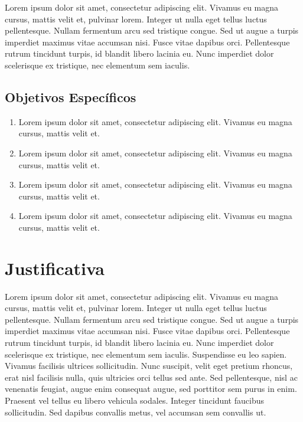 Lorem ipsum dolor sit amet, consectetur adipiscing elit. Vivamus eu magna cursus, mattis velit et, pulvinar lorem. Integer ut nulla eget tellus luctus pellentesque. Nullam fermentum arcu sed tristique congue. Sed ut augue a turpis imperdiet maximus vitae accumsan nisi. Fusce vitae dapibus orci. Pellentesque rutrum tincidunt turpis, id blandit libero lacinia eu. Nunc imperdiet dolor scelerisque ex tristique, nec elementum sem iaculis.

\subsection{Objetivos Específicos}
\begin{enumerate}
    \item Lorem ipsum dolor sit amet, consectetur adipiscing elit. Vivamus eu magna cursus, mattis velit et.
    \item Lorem ipsum dolor sit amet, consectetur adipiscing elit. Vivamus eu magna cursus, mattis velit et.
    \item Lorem ipsum dolor sit amet, consectetur adipiscing elit. Vivamus eu magna cursus, mattis velit et.
    \item Lorem ipsum dolor sit amet, consectetur adipiscing elit. Vivamus eu magna cursus, mattis velit et.
\end{enumerate}

\section{Justificativa}
\label{sec:justificativa}

Lorem ipsum dolor sit amet, consectetur adipiscing elit. Vivamus eu magna cursus, mattis velit et, pulvinar lorem. Integer ut nulla eget tellus luctus pellentesque. Nullam fermentum arcu sed tristique congue. Sed ut augue a turpis imperdiet maximus vitae accumsan nisi. Fusce vitae dapibus orci. Pellentesque rutrum tincidunt turpis, id blandit libero lacinia eu. Nunc imperdiet dolor scelerisque ex tristique, nec elementum sem iaculis. Suspendisse eu leo sapien. Vivamus facilisis ultrices sollicitudin. Nunc suscipit, velit eget pretium rhoncus, erat nisl facilisis nulla, quis ultricies orci tellus sed ante. Sed pellentesque, nisl ac venenatis feugiat, augue enim consequat augue, sed porttitor sem purus in enim. Praesent vel tellus eu libero vehicula sodales. Integer tincidunt faucibus sollicitudin. Sed dapibus convallis metus, vel accumsan sem convallis ut.

